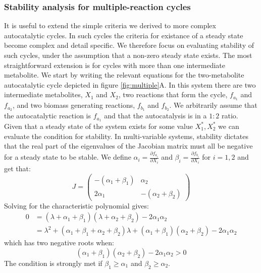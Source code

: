     \subsubsection{Stability analysis for multiple-reaction cycles}
    It is useful to extend the simple criteria we derived to more complex autocatalytic cycles.
    In such cycles the criteria for existance of a steady state become complex and detail specific.
    We therefore focus on evaluating stability of such cycles, under the assumption that a non-zero steady state exists.
    The most straightforward extension is for cycles with more than one intermediate metabolite.
    We start by writing the relevant equations for the two-metabolite autocatalytic cycle depicted in figure \ref{fig:multiple}A.
    In this system there are two intermediate metabolites, $X_1$ and $X_2$, two reactions that form the cycle, $f_{a_1}$ and $f_{a_2}$, and two biomass generating reactions, $f_{b_1}$ and $f_{b_2}$.
    We arbitrarily assume that the autocatalytic reaction is $f_{a_1}$ and that the autocatalysis is in a $1:2$ ratio.
    Given that a steady state of the system exists for some value $X_1^*,X_2^*$ we can evaluate the condition for stability.
    In multi-variable systems, stability dictates that the real part of the eigenvalues of the Jacobian matrix must all be negative for a steady state to be stable.
    We define $\alpha_i=\frac{\partial f_{a_i}}{\partial X_i}$ and $\beta_i=\frac{\partial f_{b_i}}{\partial X_i}$ for $i=1,2$ and get that:
    \begin{equation*}
        J=
        \begin{pmatrix}
            -(\alpha_1+\beta_1) & \alpha_2 \\
            2\alpha_1 & -(\alpha_2+\beta_2)
        \end{pmatrix}
    \end{equation*}
    Solving for the characteristic polynomial gives:
    \begin{align*}
        0 & =(\lambda+\alpha_1+\beta_1)(\lambda+\alpha_2+\beta_2)-2\alpha_1\alpha_2 \\
        & = \lambda^2+(\alpha_1+\beta_1+\alpha_2+\beta_2)\lambda+(\alpha_1+\beta_1)(\alpha_2+\beta_2)-2\alpha_1\alpha_2
    \end{align*}
    which has two negative roots when:
    \begin{equation*}
        (\alpha_1+\beta_1)(\alpha_2+\beta_2)-2\alpha_1\alpha_2>0
    \end{equation*}
    The condition is strongly met if $\beta_1\geq \alpha_1$ and $\beta_2\geq\alpha_2$.
    
